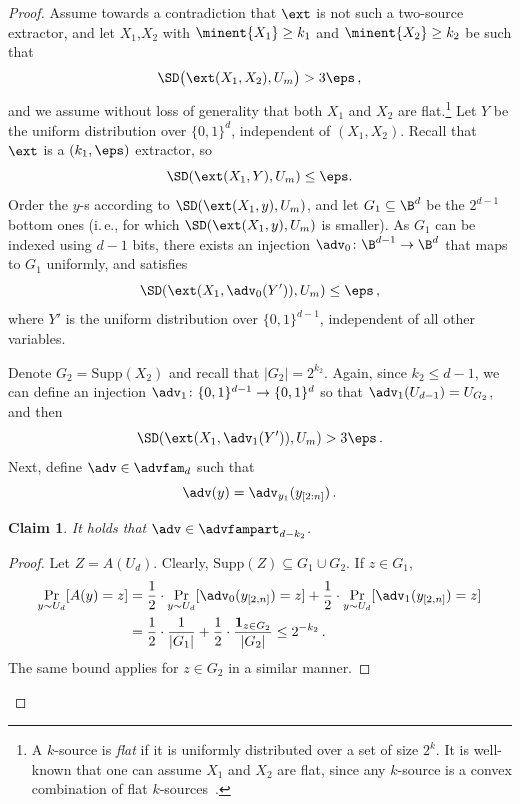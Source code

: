 \documentclass[11pt]{article}
\numberwithin{equation}{section}
\newtheorem{claim}[theorem]{Claim}
\theoremstyle{definition}
\theoremstyle{plain}
\newcommand{\ie}{i.\,e.}
\begin{document}
\begin{proof}
 Assume towards a contradiction that $\ext$ is not such a two-source extractor, and let $X_1$,$ X_2$ with  $\minent{X_1} \geq k_1$ and $\minent{X_2} \geq k_2$ be such that 
	\[
	\SD\big(\ext(X_1,X_2), U_m \big) > 3\eps\,,
	\]
and we assume without loss of generality that both $X_1$ and $X_2$
are flat.\footnote{A $k$-source is \emph{flat} if it is uniformly distributed over a set of size $2^k$. It is well-known that one can assume $X_1$ and $X_2$ are flat, since any $k$-source is a convex combination of flat $k$-sources~\cite{CG88}.}
	Let $Y$ be the uniform distribution over $\{0,1\}^d$, independent of $(X_1, X_2)$.
	Recall that $\ext$ is a $(k_1, \eps)$ extractor, so 
	\[
	\SD(\ext(X_1,Y) ,U_m) \le \eps.
	\]
Order the $y$-s according to $\SD(\ext(X_1,y),U_m)$, and let $G_1 \subseteq \B^d$
be the $2^{d-1}$ bottom ones (\ie, for which $\SD(\ext(X_1,y),U_m)$ is smaller).
As $G_1$ can be indexed using $d-1$ bits, there exists an injection
$\adv_0 \colon \B^{d-1} \rightarrow \B^{d}$ that maps to $G_1$ uniformly, and satisfies
		\begin{equation}\label{eq:1}
	\SD(\ext(X_1,\adv_0(Y')),U_m) \leq \eps\,,
	\end{equation}
	where $Y'$ is the uniform distribution over $\{0,1\}^{d-1}$, independent of
	all other variables.

Denote $G_2 = \mathrm{Supp}(X_2)$ and recall that $|G_2| = 2^{k_2}$.
Again, since $k_2 \leq d -1$, we can define an injection $\adv_1 \colon \{0,1\}^{d-1} \rightarrow \{0,1\}^d$
so that $\adv_1(U_{d-1}) = U_{G_2}$, and then
	\begin{equation}\label{eq:2}
	\SD(\ext(X_1,\adv_1(Y')),U_m) > 3\eps\,.
	\end{equation}
Next, define $\adv \in \advfam_d$ such that \[\adv(y) = \adv_{y_1}(y_{[2:n]})\,.\]
\begin{claim}
It holds that $\adv\in \advfampart_{d-k_2}$.
\end{claim}
\begin{proof}
Let $Z = A(U_d)$. Clearly, $\mathrm{Supp}(Z) \subseteq G_1 \cup G_2$.
If $z \in G_1$,
\begin{align*}
\Pr_{y \sim U_d}[A(y) = z] &= \frac{1}{2} \cdot \Pr_{y \sim U_d}[\adv_0(y_{[2,n]})  = z]
+ \frac{1}{2} \cdot \Pr_{y \sim U_d}[\adv_1(y_{[2,n]})  = z] \\
&= \frac{1}{2} \cdot \frac{1}{|G_1|} + \frac{1}{2} \cdot \frac{\mathbf{1}_{z \in G_2}}{|G_2|}
\le 2^{-k_2}\,.
\end{align*}
The same bound applies for $z \in G_2$ in a similar manner.
\end{proof}



\end{proof}
\end{document}
